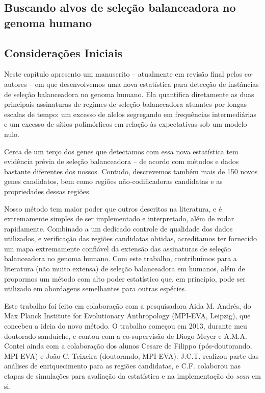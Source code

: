 \begin{refsection}
\chapter{Buscando alvos de seleção balanceadora no genoma humano}
\pagestyle{fancy}
\fancyhf{}
\fancyfoot[C]{\thepage}
\section{Considerações Iniciais}%
Neste capítulo apresento um manuscrito -- atualmente em revisão final pelos co-autores -- em que desenvolvemos uma nova estatística para detecção de instâncias de seleção balanceadora no genoma humano. Ela quantifica diretamente as duas principais assinaturas de regimes de seleção balanceadora atuantes por longas escalas de tempo: um excesso de alelos segregando em frequências intermediárias e um excesso de sítios polimórficos em relação às expectativas sob um modelo nulo.

Cerca de um terço dos genes que detectamos com essa nova estatística tem evidência prévia de seleção balanceadora -- de acordo com métodos e dados bastante diferentes dos nossos. Contudo, descrevemos também mais de 150 novos genes candidatos, bem como regiões não-codificadoras candidatas e as propriedades dessas regiões.

Nosso método tem maior poder que outros  descritos na literatura, e é extremamente simples de ser implementado e interpretado, além de rodar rapidamente. Combinado a um dedicado controle de qualidade dos dados utilizados, e verificação das regiões candidatas obtidas, acreditamos ter fornecido um mapa extremamente confiável da extensão das assinaturas de seleção balanceadora no genoma humano. Com este trabalho, contribuímos para a literatura (não muito extensa) de seleção balanceadora em humanos, além de propormos um método com alto poder estatístico que, em princípio, pode ser utilizado em abordagens semelhantes para outras espécies.

Este trabalho foi feito em colaboração com a pesquisadora Aida M. Andrés, do Max Planck Institute for Evolutionary Anthropology (MPI-EVA, Leipzig), que concebeu a ideia do novo método. O trabalho começou em 2013, durante meu doutorado sanduíche, e contou com a co-supervisão de Diogo Meyer e A.M.A. Contei ainda com a colaboração dos alunos Cesare de Filippo (pós-doutorando, MPI-EVA) e João C. Teixeira (doutorando, MPI-EVA). J.C.T. realizou parte das análises de enriquecimento para as regiões candidatas, e C.F. colaborou nas etapas de simulações para avaliação da estatística e na implementação do \emph{scan} em si.  


\end{refsection}
